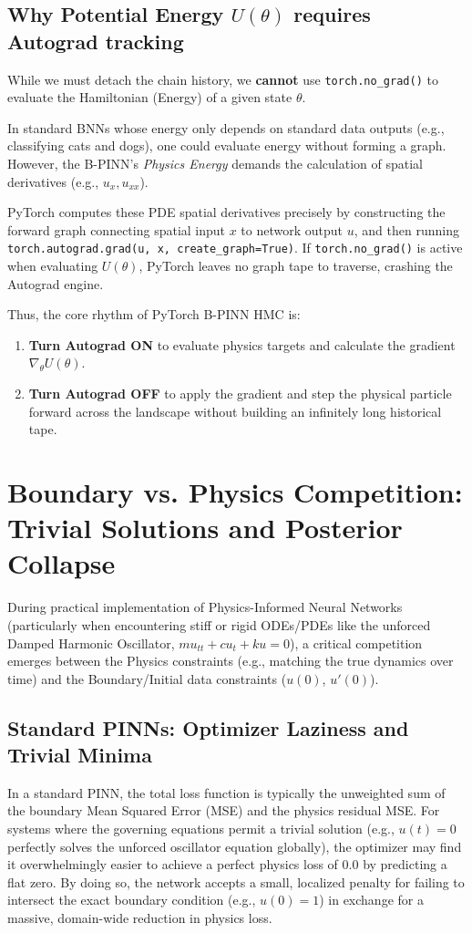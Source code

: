 \documentclass[11pt, a4paper]{article}
\begin{document}
\subsection{Why Potential Energy $U(\theta)$ requires Autograd tracking}
While we must detach the chain history, we \textbf{cannot} use \texttt{torch.no\_grad()} to evaluate the Hamiltonian (Energy) of a given state $\theta$. 

In standard BNNs whose energy only depends on standard data outputs (e.g., classifying cats and dogs), one could evaluate energy without forming a graph. However, the B-PINN's \textit{Physics Energy} demands the calculation of spatial derivatives (e.g., $u_x, u_{xx}$). 

PyTorch computes these PDE spatial derivatives precisely by constructing the forward graph connecting spatial input $x$ to network output $u$, and then running \texttt{torch.autograd.grad(u, x, create\_graph=True)}. If \texttt{torch.no\_grad()} is active when evaluating $U(\theta)$, PyTorch leaves no graph tape to traverse, crashing the Autograd engine.

Thus, the core rhythm of PyTorch B-PINN HMC is:
\begin{enumerate}
    \item \textbf{Turn Autograd ON} to evaluate physics targets and calculate the gradient $\nabla_\theta U(\theta)$.
    \item \textbf{Turn Autograd OFF} to apply the gradient and step the physical particle forward across the landscape without building an infinitely long historical tape.
\end{enumerate}

\section{Boundary vs. Physics Competition: Trivial Solutions and Posterior Collapse}

During practical implementation of Physics-Informed Neural Networks (particularly when encountering stiff or rigid ODEs/PDEs like the unforced Damped Harmonic Oscillator, $m u_{tt} + c u_t + k u = 0$), a critical competition emerges between the Physics constraints (e.g., matching the true dynamics over time) and the Boundary/Initial data constraints ($u(0)$, $u'(0)$). 

\subsection{Standard PINNs: Optimizer Laziness and Trivial Minima}
In a standard PINN, the total loss function is typically the unweighted sum of the boundary Mean Squared Error (MSE) and the physics residual MSE. For systems where the governing equations permit a trivial solution (e.g., $u(t) = 0$ perfectly solves the unforced oscillator equation globally), the optimizer may find it overwhelmingly easier to achieve a perfect physics loss of $0.0$ by predicting a flat zero. By doing so, the network accepts a small, localized penalty for failing to intersect the exact boundary condition (e.g., $u(0)=1$) in exchange for a massive, domain-wide reduction in physics loss.
\end{document}
